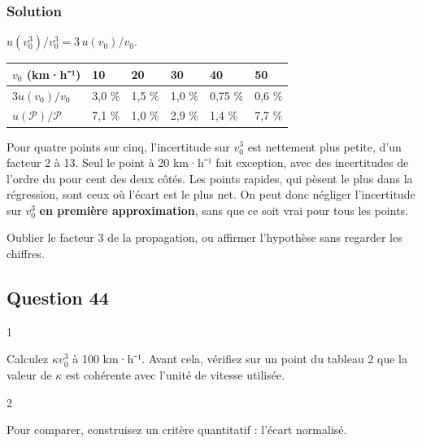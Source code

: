 \documentclass[11pt,a4paper]{article}
\begin{document}
\hypertarget{solution-42}{%
\subsubsection{Solution}\label{solution-42}}

\(u(v_0^3)/v_0^3=3\,u(v_0)/v_0\).

\begin{longtable}[]{@{}llllll@{}}
\toprule\noalign{}
\(v_0\) (km·h⁻¹) & 10 & 20 & 30 & 40 & 50 \\
\midrule\noalign{}
\endhead
\bottomrule\noalign{}
\endlastfoot
\(3u(v_0)/v_0\) & 3,0 \% & 1,5 \% & 1,0 \% & 0,75 \% & 0,6 \% \\
\(u(\mathcal P)/\mathcal P\) & 7,1 \% & 1,0 \% & 2,9 \% & 1,4 \% & 7,7 \% \\
\end{longtable}

Pour quatre points sur cinq, l'incertitude sur \(v_0^3\) est nettement plus petite, d'un facteur 2 à 13. Seul le point à 20 km·h⁻¹ fait exception, avec des incertitudes de l'ordre du pour cent des deux côtés. Les points rapides, qui pèsent le plus dans la régression, sont ceux où l'écart est le plus net. On peut donc négliger l'incertitude sur \(v_0^3\) \textbf{en première approximation}, sans que ce soit vrai pour tous les points.

\begin{piege}

Oublier le facteur 3 de la propagation, ou affirmer l'hypothèse sans regarder les chiffres.

\end{piege}

\hypertarget{question-44}{%
\subsection{Question 44}\label{question-44}}

\begin{indication}{1}

Calculez \(\kappa v_0^3\) à 100 km·h⁻¹. Avant cela, vérifiez sur un point du tableau 2 que la valeur de \(\kappa\) est cohérente avec l'unité de vitesse utilisée.

\end{indication}

\begin{indication}{2}

Pour comparer, construisez un critère quantitatif : l'écart normalisé.

\end{indication}
\end{document}
